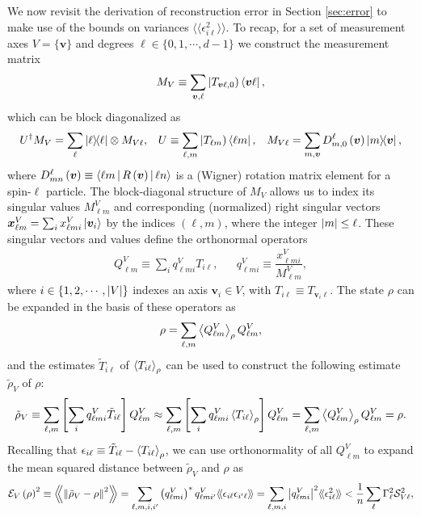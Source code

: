 \documentclass[notitlepage,twocolumn]{revtex4-2}
\newcommand{\f}[2]{\dfrac{#1}{#2}} %
\newcommand{\p}[1]{\left(#1\right)} %
\renewcommand{\sp}[1]{\left[#1\right]} %
\newcommand{\bk}{\Braket} %
\renewcommand{\v}{\bm} %
\renewcommand{\set}[1]{\{#1\}} %
\newcommand{\bbk}[1]{\langle\!\langle #1 \rangle\!\rangle}
\newcommand{\Bbk}[1]
{\left\langle\!\!\left\langle #1 \right\rangle\!\!\right\rangle}
\newcommand{\E}{\mathcal{E}}
\renewcommand{\S}{\mathcal{S}}
\def\oket#1{\mathinner{|{#1})}}
\begin{document}
We now revisit the derivation of reconstruction error in Section \ref{sec:error} to make use of the bounds on variances $\bbk{\epsilon_{i\ell}^2}$.
To recap, for a set of measurement axes $V=\set{\v v}$ and degrees $\ell\in\set{0,1,\cdots,d-1}$ we construct the measurement matrix
\begin{align}
  M_V \equiv \sum_{\v v,\ell} \oket{T_{\v v\ell,0}} \bra{\v v\ell},
\end{align}
which can be block diagonalized as
\begin{align}
  U^\dag M_V = \sum_\ell \op{\ell} \otimes M_{V\ell},
  &&
  U \equiv \sum_{\ell,m} \oket{T_{\ell m}} \bra{\ell m},
  &&
  M_{V\ell} = \sum_{m,\v v} D^\ell_{m,0}\p{\v v} \op{m}{\v v},
\end{align}
where $D^\ell_{mn}\p{\v v}\equiv\bk{\ell m|R\p{\v v}|\ell n}$ is a (Wigner) rotation matrix element for a spin-$\ell$ particle.
The block-diagonal structure of $M_V$ allows us to index its singular values $M^V_{\ell m}$ and corresponding (normalized) right singular vectors $\v x^V_{\ell m} = \sum_i x^V_{\ell m i} \ket{\v v_i}$ by the indices $\p{\ell,m}$, where the integer $\abs{m}\le\ell$.
These singular vectors and values define the orthonormal operators
\begin{align}
  Q^V_{\ell m} \equiv \sum_i q^V_{\ell mi} T_{i\ell},
  &&
  q^V_{\ell m i} \equiv \f{x^V_{\ell m i}}{M^V_{\ell m}},
\end{align}
where $i\in\set{1,2,\cdots,\abs{V}}$ indexes an axis $\v v_i\in V$, with $T_{i\ell} \equiv T_{\v v_i\ell}$.
The state $\rho$ can be expanded in the basis of these operators as
\begin{align}
  \rho = \sum_{\ell,m} \bk{Q^V_{\ell m}}_\rho Q^V_{\ell m},
\end{align}
and the estimates $\tilde T_{i\ell}$ of $\bk{T_{i\ell}}_\rho$ can be used to construct the following estimate $\tilde\rho_V$ of $\rho$:
\begin{align}
  \tilde\rho_V \equiv \sum_{\ell,m}
  \sp{\sum_i q^V_{\ell mi} \tilde T_{i\ell}} Q^V_{\ell m}
  \approx \sum_{\ell,m}
  \sp{\sum_i q^V_{\ell mi} \bk{T_{i\ell}}_\rho} Q^V_{\ell m}
  = \sum_{\ell,m} \bk{Q^V_{\ell m}}_\rho Q^V_{\ell m}
  = \rho.
\end{align}
Recalling that $\epsilon_{i\ell} \equiv \tilde T_{i\ell} - \bk{T_{i\ell}}_\rho$, we can use orthonormality of all $Q^V_{\ell m}$ to expand the mean squared distance between $\tilde\rho_V$ and $\rho$ as
\begin{align}
  \E_V\p{\rho}^2 \equiv \Bbk{\norm{\tilde\rho_V-\rho}^2}
  = \sum_{\ell,m,i,i'} \p{q^V_{\ell mi}}^* q^V_{\ell mi'} \bbk{\epsilon_{i\ell} \epsilon_{i'\ell}}
  = \sum_{\ell,m,i} \abs{q^V_{\ell mi}}^2 \bbk{\epsilon_{i\ell}^2}
  < \f1n \sum_\ell \Gamma_\ell^2 \S_{V\ell}^2,
  \label{eq:bound_apndx}
\end{align}
\end{document}
